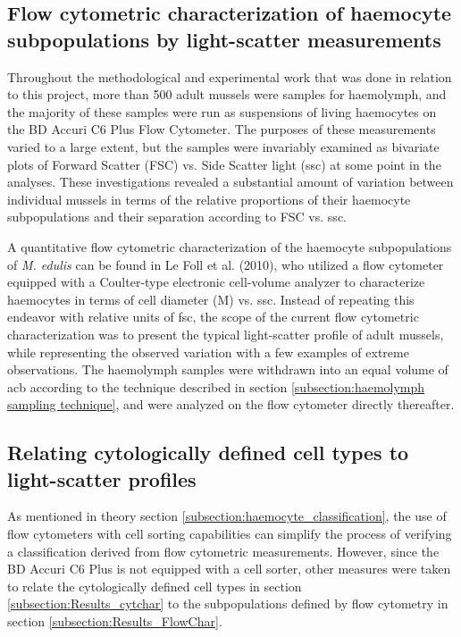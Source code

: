 \subsection{Flow cytometric characterization of haemocyte subpopulations by light-scatter measurements}
Throughout the methodological and experimental work that was done in relation to this project, more than 500 adult mussels were samples for haemolymph, and the majority of these samples were run as suspensions of living haemocytes on the BD Accuri C6 Plus Flow Cytometer. The purposes of these measurements varied to a large extent, but the samples were invariably examined as bivariate plots of Forward Scatter (FSC) vs. Side Scatter light (\acrshort{ssc}) at some point in the analyses. These investigations revealed a substantial amount of variation between individual mussels in terms of the relative proportions of their haemocyte subpopulations and their separation according to FSC vs. \acrshort{ssc}.

A quantitative flow cytometric characterization of the haemocyte subpopulations of \emph{M. edulis} can be found in Le Foll et al. (2010), who utilized a flow cytometer equipped with a Coulter-type electronic cell-volume analyzer to characterize haemocytes in terms of cell diameter (\micro M) vs. \acrshort{ssc}. Instead of repeating this endeavor with relative units of \acrshort{fsc}, the scope of the current flow cytometric characterization was to present the typical light-scatter profile of adult mussels, while representing the observed variation with a few examples of extreme observations. The haemolymph samples were withdrawn into an equal volume of \acrshort{acb} according to the technique described in section \ref{subsection:haemolymph sampling technique}, and were analyzed on the flow cytometer directly thereafter.

\subsection{Relating cytologically defined cell types to light-scatter profiles}
As mentioned in theory section \ref{subsection:haemocyte_classification}, the use of flow cytometers with cell sorting capabilities can simplify the process of verifying a classification derived from flow cytometric measurements. However, since the BD Accuri C6 Plus is not equipped with a cell sorter, other measures were taken to relate the cytologically defined cell types in section \ref{subsection:Results_cytchar} to the subpopulations defined by flow cytometry in section \ref{subsection:Results_FlowChar}.


